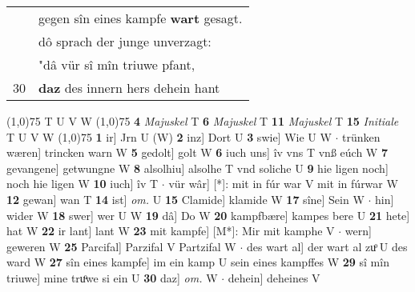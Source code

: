 \documentclass[8pt,a4paper,notitlepage]{article}
\begin{document}
\begin{table}[ht]
\begin{minipage}[t]{0.5\linewidth}
\begin{tabular}{rl}
 & gegen sîn eines kampfe \textbf{wart} gesagt.\\ 
 & dô sprach der junge unverzagt:\\ 
 & "dâ vür sî mîn triuwe pfant,\\ 
30 & \textbf{daz} des innern hers dehein hant\\ 
\end{tabular}
\scriptsize
\line(1,0){75} \newline
T U V W \newline
\line(1,0){75} \newline
\textbf{4} \textit{Majuskel} T  \textbf{6} \textit{Majuskel} T  \textbf{11} \textit{Majuskel} T  \textbf{15} \textit{Initiale} T U V W  \newline
\line(1,0){75} \newline
\textbf{1} ir] Jrn U (W) \textbf{2} inz] Dort U \textbf{3} swie] Wie U W  $\cdot$ trünken wæren] trincken warn W \textbf{5} gedolt] golt W \textbf{6} iuch uns] îv vns T vnß eúch W \textbf{7} gevangene] getwungne W \textbf{8} alsolhiu] alsolhe T vnd soliche U \textbf{9} hie ligen noch] noch hie ligen W \textbf{10} iuch] îv T  $\cdot$ vür wâr] [*]: mit in fúr war V mit in fúrwar W \textbf{12} gewan] wan T \textbf{14} ist] \textit{om.} U \textbf{15} Clamide] klamide W \textbf{17} sîne] Sein W  $\cdot$ hin] wider W \textbf{18} swer] wer U W \textbf{19} dâ] Do W \textbf{20} kampfbære] kampes bere U \textbf{21} hete] hat W \textbf{22} ir lant] lant W \textbf{23} mit kampfe] [M*]: Mir mit kamphe V  $\cdot$ wern] geweren W \textbf{25} Parcifal] Parzifal V Partzifal W  $\cdot$ des wart al] der wart al zuͦ U des ward W \textbf{27} sîn eines kampfe] im ein kamp U sein eines kampffes W \textbf{29} sî mîn triuwe] mine truͦwe si ein U \textbf{30} daz] \textit{om.} W  $\cdot$ dehein] deheines V \newline
\end{minipage}
\end{table}
\end{document}

